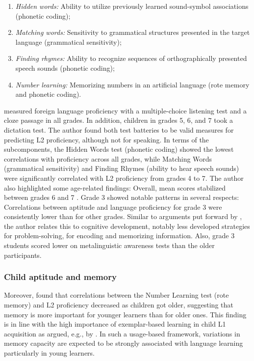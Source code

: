 \documentclass[output=paper]{langscibook}
\begin{document}
\begin{enumerate}
\item \textit{Hidden words:} Ability to utilize previously learned sound-symbol associations (phonetic coding); 
\item \textit{Matching words:} Sensitivity to grammatical structures presented in the target language (grammatical sensitivity); 
\item \textit{Finding rhymes:} Ability to recognize sequences of orthographically presented speech sounds (phonetic coding); 
\item \textit{Number learning:} Memorizing numbers in an artificial language (rote memory and phonetic coding). 
\end{enumerate}

\citet{SuarezVilagran2010} measured foreign language proficiency with a multiple-choice listening test and a cloze passage in all grades. In addition, children in grades 5, 6, and 7 took a dictation test. The author found both test batteries to be valid measures for predicting L2 proficiency, although not for speaking. In terms of the subcomponents, the Hidden Words test (phonetic coding) showed the lowest correlations with proficiency across all grades, while Matching Words (grammatical sensitivity) and Finding Rhymes (ability to hear speech sounds) were significantly correlated with L2 proficiency from grades 4 to 7. The author also highlighted some age-related findings: Overall, mean scores stabilized between grades 6 and 7 \citep[349]{SuarezVilagran2010}. Grade 3 showed notable patterns in several respects: Correlations between aptitude and language proficiency for grade 3 were consistently lower than for other grades. Similar to arguments put forward by \citet{Kiss2009}, the author relates this to cognitive development, notably less developed strategies for problem-solving, for encoding and memorizing information. Also, grade 3 students scored lower on metalinguistic awareness tests than the older participants.

\subsubsection{Child aptitude and memory}\label{sec:01:2.2.3} %

Moreover, \citet{SuarezVilagran2010} found that correlations between the Number Learning test (rote memory) and L2 proficiency decreased as children got older, suggesting that memory is more important for younger learners than for older ones. This finding is in line with the high importance of exemplar-based learning in child L1 acquisition as argued, e.g., by \citet{Tomasello2005}. In such a usage-based framework, variations in memory capacity are expected to be strongly associated with language learning particularly in young learners.
\end{document}

